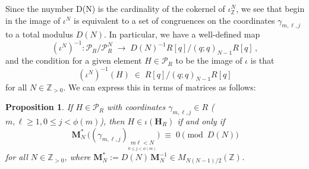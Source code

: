 \documentclass[12pt,reqno]{amsart}
\newtheorem{proposition}{Proposition}[section]
\theoremstyle{definition}
\def\BZ{\mathbb Z}
\def\bM{\mathbf{M}}
\def\calP{\mathcal P}
\def\HH{\mathbf H}
\def\be{\begin{equation}}
\def\ee{\end{equation}}
\def\inn{\;\in\;}
\begin{document}
\medskip

Since the nuymber D(N) is the cardinality of the cokernel of $\iota_\BZ^{N}$, we
see that begin in the image of $\iota^{N}$ is equivalent to a set of congruences
on the coordinates $\gamma_{m,\ell,j}$ to a total modulus $D(N)$.
In particular, we have a well-defined map
\be
(\iota^{N})^{-1}:\calP_{R}/\calP_R^{N}\;\to\;D(N)^{-1}R[q]/(q;q)_{N-1}R[q]\,,
\ee
and the condition for a given element $H\in\calP_{R}$ to be the image of $\iota$
is that
\be
(\iota^{N})^{-1}(H)\inn R[q]/(q;q)_{N-1}R[q]
\ee
for all $N\in\BZ_{>0}$. We can express this in terms of matrices as follows:

\begin{proposition}
\label{prop:imiota}
If $H\in\calP_{R}$ with coordinates $\gamma_{m,\ell,j}\in R$
($m,\ell\geq 1,0\leq j<\phi(m)$), then $H\in\iota(\HH_{R})$
if and only if
\be
\bM_{N}^{*} \,
\Big((\gamma_{m,\ell,j})_{\underset{0\leq j<\phi(m)}{m\ell<N}}\Big)
\;\equiv\; 0\pmod{D(N)}
\ee
for all $N\in\BZ_{>0}$, where $\bM_{N}^{*}:=D(N)\,\bM_{N}^{-1}\in M_{N(N-1)/2}(\BZ)$.
\end{proposition}
\end{document}
